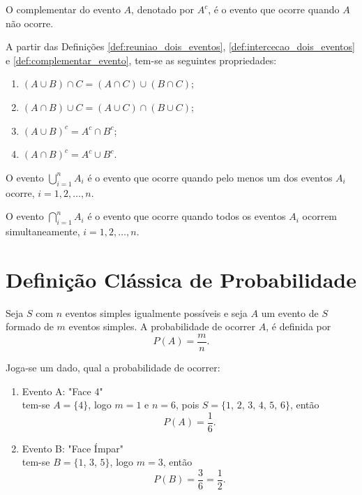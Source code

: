 \documentclass[11pt,fleqn]{book}
\numberwithin{mpicture}{chapter}
\numberwithin{mtable}{chapter}
\numberwithin{mframe}{chapter}
\begin{document}
\begin{definition}
	\label{def:complementar_evento}
	O complementar do evento $A$, denotado por $A^{c}$, é o evento que ocorre quando $A$ não ocorre.
\end{definition}

\begin{theorem}
	A partir das Definições \ref{def:reuniao_dois_eventos}, \ref{def:intercecao_dois_eventos} e \ref{def:complementar_evento}, tem-se as seguintes propriedades:
	\begin{enumerate}
		\item $(A\cup B)\cap C = (A\cap C)\cup (B\cap C)$;
		\item $(A\cap B)\cup C = (A\cup C)\cap (B\cup C)$;
		\item $(A\cup B)^c = A^c \cap B^c$;
		\item $(A\cap B)^c= A^c\cup B^c$.
	\end{enumerate}
\end{theorem}

\begin{definition}
	O evento $\displaystyle\bigcup_{i=1}^{n} A_i$ é o evento que ocorre quando pelo menos um dos eventos $A_i$ ocorre, $i=1,2,\dots, n$.
\end{definition}

\begin{definition}
	O evento $\displaystyle\bigcap_{i=1}^{n} A_i$ é o evento que ocorre quando todos os eventos $A_i$ ocorrem simultaneamente, $i=1,2,\dots, n$.
\end{definition}

\section{Definição Clássica de Probabilidade}

Seja $S$ com $n$ eventos simples igualmente possíveis e seja $A$ um evento de $S$ formado de $m$ eventos simples. A probabilidade de ocorrer $A$, é definida por
\begin{equation}
	P(A)=\frac{m}{n}\text{.}
\end{equation}

\begin{example}
	Joga-se um dado, qual a probabilidade de ocorrer:
	\begin{enumerate}[label=\alph*)]
		\item Evento A: "Face 4"\\
		
		tem-se $A=\{4\}$, logo $m=1$ e $n=6$, pois $S=\{1$, $2$, $3$, $4$, $5$, $6\}$, então
		\[
			P(A)=\frac{1}{6}\text{.}
		\]
		
		\item Evento B: "Face Ímpar"\\
		
		tem-se $B=\{1$, $3$, $5\}$, logo $m=3$, então
		\[
			P(B)=\frac{3}{6}=\frac{1}{2}\text{.}
		\]
	\end{enumerate}
\end{example}
\end{document}
